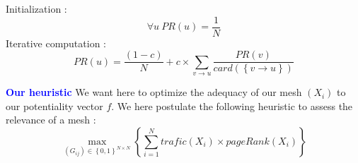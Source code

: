 \documentclass[a4, 14pts]{seminar}
\begin{document}
{{\begin{slide}
	    \newline
	    Initialization :
	    \begin{equation}
	    \forall u \ PR\left(u\right)=\frac{1}{N}
	    \end{equation} 
	    Iterative computation :
	    \begin{equation}
	    PR\left(u\right)= \frac{\left(1-c\right)}{N} + c \times \sum_{v \rightarrow u}\frac{PR\left(v\right)}{card\left(\left\{v\rightarrow u\right\}\right)}
	    \end{equation}
	    \end{slide}
	    \begin{slide}
	    \textbf{\textcolor{blue}{\large Our heuristic}}\newline 
	    We want here to optimize the adequacy of our mesh $\left(X_i\right)$ to our potentiality vector $f$.
	    We here postulate the following heuristic to assess the relevance of a mesh :
	    \begin{equation}
	    \max_{\left(G_{ij}\right)  \in \left\{0,1\right\}^{N\times N}}\left\{ \sum^{N}_{i=1} trafic\left(X_i\right)\times pageRank(X_i)\right\}
	    \end{equation} 
	    \end{slide}

}}
\end{document}
